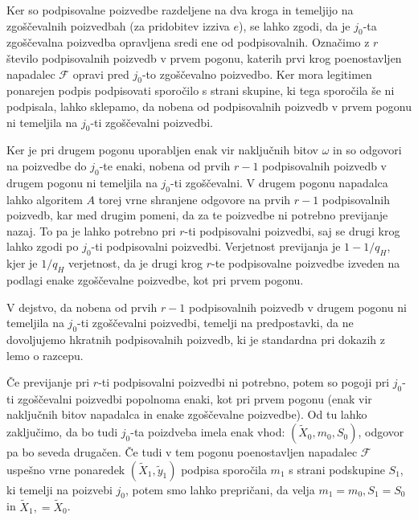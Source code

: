 \documentclass[isrm2, tisk]{fmfdelo}
\begin{document}
Ker so podpisovalne poizvedbe razdeljene na dva kroga in temeljijo na zgoščevalnih poizvedbah (za
pridobitev izziva $e$), se lahko zgodi, da je $j_0$-ta zgoščevalna poizvedba opravljena sredi ene
od podpisovalnih. Označimo z $r$ število podpisovalnih poizvedb v prvem pogonu, katerih prvi krog
poenostavljen napadalec $\mathcal{F}$ opravi pred $j_0$-to zgoščevalno poizvedbo. Ker mora legitimen
ponarejen podpis podpisovati sporočilo s strani skupine, ki tega sporočila še ni podpisala, lahko
sklepamo, da nobena od podpisovalnih poizvedb v prvem pogonu ni temeljila na $j_0$-ti zgoščevalni
poizvedbi.

Ker je pri drugem pogonu uporabljen enak vir naključnih bitov $\omega$ in so odgovori na poizvedbe do
$j_0$-te enaki, nobena od prvih $r - 1$ podpisovalnih poizvedb v drugem pogonu ni temeljila na $j_0$-ti
zgoščevalni. V drugem pogonu napadalca lahko algoritem $A$ torej vrne shranjene odgovore na prvih
$r - 1$ podpisovalnih poizvedb, kar med drugim pomeni, da za te poizvedbe ni potrebno previjanje
nazaj. To pa je lahko potrebno pri $r$-ti podpisovalni poizvedbi, saj se drugi krog lahko zgodi po
$j_0$-ti podpisovalni poizvedbi. Verjetnost previjanja je $1 - 1/q_H$, kjer je $1/q_H$ verjetnost,
da je drugi krog $r$-te podpisovalne poizvedbe izveden na podlagi enake zgoščevalne poizvedbe, kot
pri prvem pogonu.

\begin{opomba}
    V dejstvo, da nobena od prvih $r - 1$ podpisovalnih poizvedb v drugem pogonu ni temeljila na
    $j_0$-ti zgoščevalni poizvedbi, temelji na predpostavki, da ne dovoljujemo hkratnih podpisovalnih
    poizvedb, ki je standardna pri dokazih z lemo o razcepu.
\end{opomba}

Če previjanje pri $r$-ti podpisovalni poizvedbi ni potrebno, potem so pogoji pri $j_0$-ti zgoščevalni
poizvedbi popolnoma enaki, kot pri prvem pogonu (enak vir naključnih bitov napadalca in enake
zgoščevalne poizvedbe). Od tu lahko zaključimo, da bo tudi $j_0$-ta poizdveba imela enak vhod:
$(\tilde{X}_0, m_0, S_0)$, odgovor pa bo seveda drugačen. Če tudi v tem pogonu poenostavljen napadalec
$\mathcal{F}$ uspešno vrne ponaredek $(\tilde{X}_1, \tilde{y}_1)$ podpisa sporočila $m_1$ s strani
podskupine $S_1$, ki temelji na poizvebi $j_0$, potem smo lahko prepričani, da velja $m_1 = m_0,
S_1 = S_0$ in $\tilde{X}_1, = \tilde{X}_0$.
\end{document}
